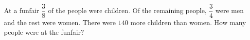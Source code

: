 At a funfair $\dfrac{3}{8}$ of the people were children. Of the remaining people, $\dfrac{3}{4}$ were men and the rest were women. There were $140$ more children than women. How many people were at the funfair?
